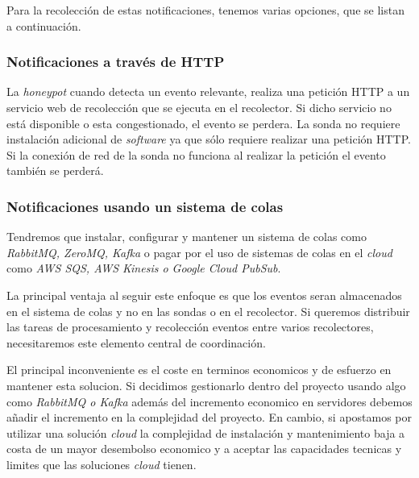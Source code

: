 Para la recolección de estas notificaciones, tenemos varias opciones, que se listan a continuación.

\subsubsection{Notificaciones a través de HTTP}

La \emph{honeypot} cuando detecta un evento relevante, realiza una petición HTTP a un servicio web de recolección que se ejecuta en el recolector.
Si dicho servicio no está disponible o esta congestionado, el evento se perdera.
La sonda no requiere instalación adicional de \emph{software} ya que sólo requiere realizar una petición HTTP. 
Si la conexión de red de la sonda no funciona al realizar la petición el evento también se perderá.

\subsubsection{Notificaciones usando un sistema de colas}
\label{subsubsec:notificaciones-colas}

Tendremos que instalar, configurar y mantener un sistema de colas como \emph{RabbitMQ, ZeroMQ, Kafka} 
o pagar por el uso de sistemas de colas en el \emph{cloud} como \emph{AWS SQS, AWS Kinesis o Google Cloud PubSub}.

La principal ventaja al seguir este enfoque es que los eventos seran almacenados en el sistema de colas y no en las sondas o en el recolector. Si queremos
distribuir las tareas de procesamiento y recolección eventos entre varios recolectores, necesitaremos este elemento central de coordinación.

El principal inconveniente es el coste en terminos economicos y de esfuerzo en mantener esta solucion. 
Si decidimos gestionarlo dentro del proyecto usando algo como \emph{RabbitMQ o Kafka} además del incremento economico en servidores 
debemos añadir el incremento en la complejidad del proyecto. En cambio, si apostamos por utilizar una solución \emph{cloud} la complejidad
de instalación y mantenimiento baja a costa de un mayor desembolso economico y a aceptar las capacidades tecnicas y limites que las soluciones 
\emph{cloud} tienen.

